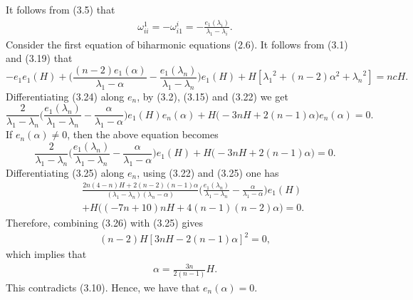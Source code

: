 \documentclass[twoside,reqno,A4]{amsart}
\theoremstyle{definition}
\theoremstyle{remark}
\numberwithin{equation}{section}
\begin{document}
It follows from (3.5) that
\begin{eqnarray}
\omega_{ii}^1=-\omega_{i1}^i=-\frac{e_1(\lambda_i)}{\lambda_1-\lambda_i}.
\end{eqnarray}
Consider the first equation of biharmonic equations (2.6). It
follows from (3.1) and (3.19) that
\begin{equation}
-e_1e_1(H)+\big(\frac{(n-2)e_1(\alpha)}{\lambda_1-\alpha}-\frac{e_1(\lambda_n)}{\lambda_1-\lambda_n}\big)e_1(H)+H[{\lambda_1}^2+(n-2)\alpha^2+{\lambda_n}^2]=ncH.
\end{equation}
Differentiating (3.24) along $e_n$, by (3.2), (3.15) and (3.22) we
get
\begin{equation*}
\frac{2}{\lambda_1-\lambda_n}\Big(\frac{e_1(\lambda_n)}{\lambda_1-\lambda_n}-\frac{\alpha}{\lambda_1-\alpha}\Big)e_1(H)e_n(\alpha)+H\big(-3nH+2(n-1)\alpha\big)e_n(\alpha)=0.
\end{equation*}
If $e_n(\alpha)\neq0$, then the above equation becomes
\begin{equation}
\frac{2}{\lambda_1-\lambda_n}\Big(\frac{e_1(\lambda_n)}{\lambda_1-\lambda_n}-\frac{\alpha}{\lambda_1-\alpha}\Big)e_1(H)+H\big(-3nH+2(n-1)\alpha\big)=0.
\end{equation}
Differentiating (3.25) along $e_n$, using (3.22) and (3.25) one has
\begin{eqnarray}
&&\frac{2n(4-n)H+2(n-2)(n-1)\alpha}{(\lambda_1-\lambda_n)(\lambda_n-\alpha)}\Big(\frac{e_1(\lambda_n)}{\lambda_1-\lambda_n}-\frac{\alpha}{\lambda_1-\alpha}\Big)e_1(H)\nonumber
\\&&+H\big((-7n+10)nH+4(n-1)(n-2)\alpha\big)=0.
\end{eqnarray}
Therefore, combining (3.26) with (3.25) gives
\begin{eqnarray*}
(n-2)H[3nH-2(n-1)\alpha]^2=0,
\end{eqnarray*}
which implies that
\begin{eqnarray*}
\alpha=\frac{3n}{2(n-1)}H.
\end{eqnarray*}
This contradicts (3.10). Hence, we have that $e_n(\alpha)=0$.
\end{document}
